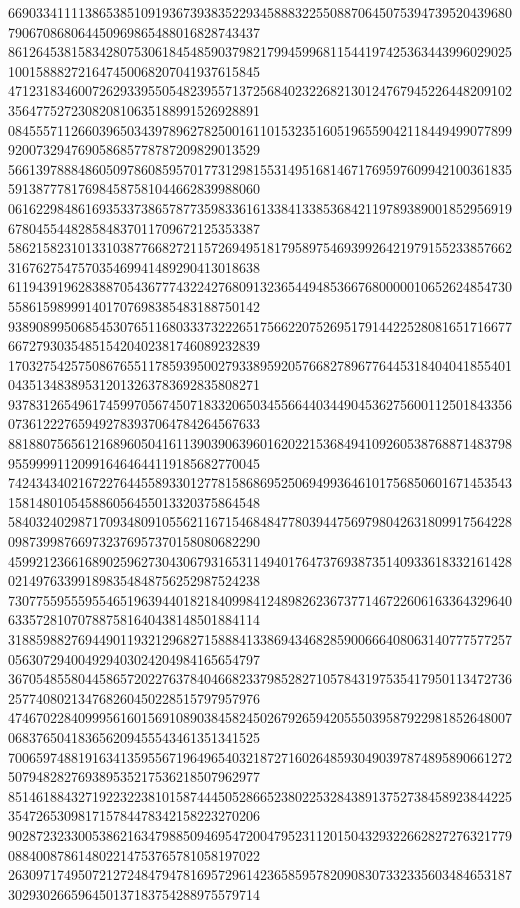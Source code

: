 \begin{DoxyCode}
      669033411113865385109193673938352293458883225508870645075394739520439680790670868064450969865488016828743437
      861264538158342807530618454859037982179945996811544197425363443996029025100158882721647450068207041937615845
      471231834600726293395505482395571372568402322682130124767945226448209102356477527230820810635188991526928891
      084555711266039650343978962782500161101532351605196559042118449499077899920073294769058685778787209829013529
      566139788848605097860859570177312981553149516814671769597609942100361835591387778176984587581044662839988060
      061622984861693533738657877359833616133841338536842119789389001852956919678045544828584837011709672125353387
      586215823101331038776682721157269495181795897546939926421979155233857662316762754757035469941489290413018638
      611943919628388705436777432242768091323654494853667680000010652624854730558615989991401707698385483188750142
      938908995068545307651168033373222651756622075269517914422528081651716677667279303548515420402381746089232839
      170327542575086765511785939500279338959205766827896776445318404041855401043513483895312013263783692835808271
      937831265496174599705674507183320650345566440344904536275600112501843356073612227659492783937064784264567633
      881880756561216896050416113903906396016202215368494109260538768871483798955999911209916464644119185682770045
      742434340216722764455893301277815868695250694993646101756850601671453543158148010545886056455013320375864548
      584032402987170934809105562116715468484778039447569798042631809917564228098739987669732376957370158080682290
      459921236616890259627304306793165311494017647376938735140933618332161428021497633991898354848756252987524238
      730775595559554651963944018218409984124898262367377146722606163364329640633572810707887581640438148501884114
      318859882769449011932129682715888413386943468285900666408063140777577257056307294004929403024204984165654797
      367054855804458657202276378404668233798528271057843197535417950113472736257740802134768260450228515797957976
      474670228409995616015691089038458245026792659420555039587922981852648007068376504183656209455543461351341525
      700659748819163413595567196496540321872716026485930490397874895890661272507948282769389535217536218507962977
      851461884327192232238101587444505286652380225328438913752738458923844225354726530981715784478342158223270206
      902872323300538621634798850946954720047952311201504329322662827276321779088400878614802214753765781058197022
      263097174950721272484794781695729614236585957820908307332335603484653187302930266596450137183754288975579714

\end{DoxyCode}
